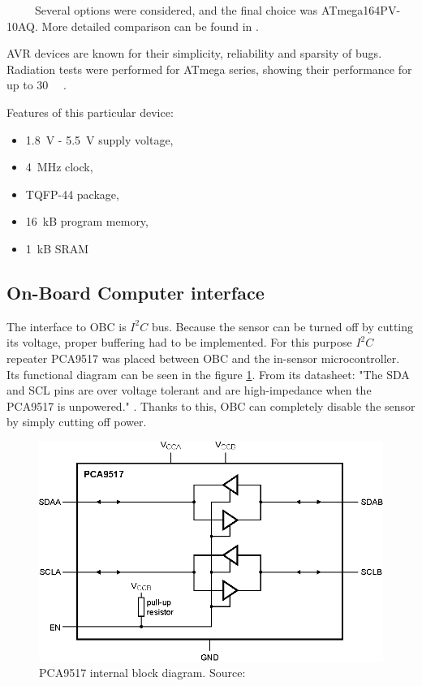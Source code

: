         Several options were considered, and the final choice was ATmega164PV-10AQ. More detailed comparison can be found in \cite{PWSAT_EPS_CDR}.

        AVR devices are known for their simplicity, reliability and sparsity of bugs. Radiation tests were performed for ATmega series, showing their performance for up to \SI{30}{\kilo\rad} \cite{ATMEGA128_radiation_tests}.

        Features of this particular device:
        \begin{itemize}
            \item \SI{1.8}{\volt} - \SI{5.5}{\volt} supply voltage,
            \item \SI{4}{\mega\hertz} clock,
            \item TQFP-44 package,
            \item \SI{16}{\kilo B} program memory,
            \item \SI{1}{\kilo B} SRAM
        \end{itemize}

    \subsection{On-Board Computer interface}
        The interface to OBC is $I^2C$ bus. Because the sensor can be turned off by cutting its voltage, proper buffering had to be implemented. For this purpose $I^2C$ repeater PCA9517 was placed between OBC and the in-sensor microcontroller. Its functional diagram can be seen in the figure \ref{PCA9517}. From its datasheet: "The SDA and SCL pins are over voltage tolerant and are high-impedance when the PCA9517 is unpowered." \cite{PCA9517_datasheet}. Thanks to this, OBC can completely disable the sensor by simply cutting off power.

        \begin{figure}[H]
            \centering
            \includegraphics[width=0.7\paperwidth]{img/06/PCA9517.eps}
            \caption{PCA9517 internal block diagram. Source: \cite{PCA9517_datasheet}}
            \label{PCA9517}
        \end{figure}


